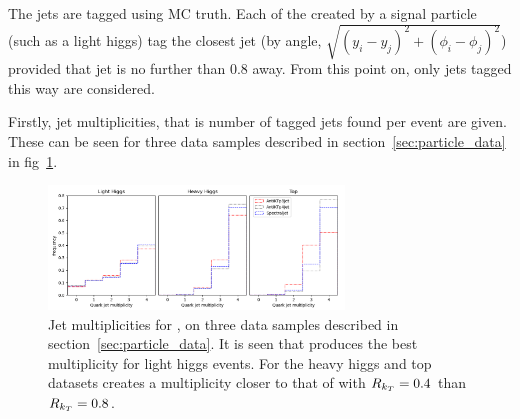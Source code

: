 The jets are tagged using MC truth.
Each of the  created by a signal particle (such as a light higgs)
tag the closest jet (by angle, \(\sqrt{(y_i - y_j)^2 + (\phi_i - \phi_j)^2}\)) provided that jet is no further than \(0.8\) away.
From this point on, only jets tagged this way are considered.


Firstly, jet multiplicities, that is number of tagged jets found per event are given.
These can be seen for three data samples described in section~\ref{sec:particle_data} in fig~\ref{fig:multiplicity}.


\begin{figure}[htp]
    \begin{center}
        \includegraphics[width=0.7\textwidth]{graphics/multiplicity/all3.png}
    \end{center}
    \caption{Jet multiplicities for \spectral{}, on three data samples described in section~\ref{sec:particle_data}.
        It is seen that \spectral{} produces the best multiplicity for light higgs events.
        For the heavy higgs and top datasets 
        \spectral{} creates a multiplicity closer to that of \antikt{} with \(R_{k_T}{} = 0.4\) 
        than \(R_{k_T}{} = 0.8\).
    }\label{fig:multiplicity}
\end{figure}    



%

